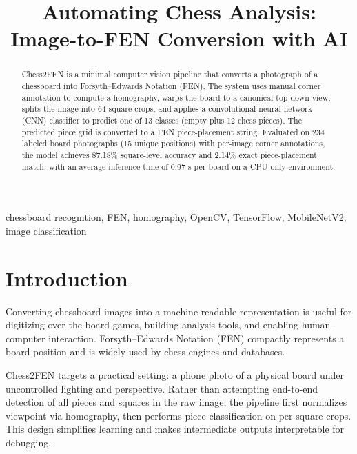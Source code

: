 \documentclass[conference]{IEEEtran}
\begin{document}
\title{Automating Chess Analysis: Image-to-FEN Conversion with AI}

\author{
\and
{}
}

\maketitle

\begin{abstract}
Chess2FEN is a minimal computer vision pipeline that converts a photograph of a chessboard into Forsyth--Edwards Notation (FEN). The system uses manual corner annotation to compute a homography, warps the board to a canonical top-down view, splits the image into 64 square crops, and applies a convolutional neural network (CNN) classifier to predict one of 13 classes (empty plus 12 chess pieces). The predicted piece grid is converted to a FEN piece-placement string. Evaluated on 234 labeled board photographs (15 unique positions) with per-image corner annotations, the model achieves 87.18\% square-level accuracy and 2.14\% exact piece-placement match, with an average inference time of 0.97 s per board on a CPU-only environment.
\end{abstract}

\begin{IEEEkeywords}
chessboard recognition, FEN, homography, OpenCV, TensorFlow, MobileNetV2, image classification
\end{IEEEkeywords}

\section{Introduction}
Converting chessboard images into a machine-readable representation is useful for digitizing over-the-board games, building analysis tools, and enabling human--computer interaction. Forsyth--Edwards Notation (FEN) compactly represents a board position and is widely used by chess engines and databases.

Chess2FEN targets a practical setting: a phone photo of a physical board under uncontrolled lighting and perspective. Rather than attempting end-to-end detection of all pieces and squares in the raw image, the pipeline first normalizes viewpoint via homography, then performs piece classification on per-square crops. This design simplifies learning and makes intermediate outputs interpretable for debugging.
\end{document}
